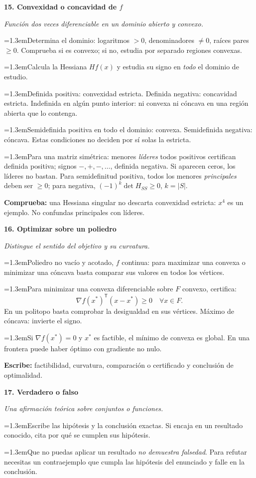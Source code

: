 \documentclass[a4paper,landscape]{article}
\newcommand{\T}{^{\mathsf T}}
\newcommand{\caso}[2]{\par\vspace{5pt}\colorbox{pale}{\parbox{\dimexpr\linewidth-2\fboxsep}{\bfseries\color{accent}#1}}\par\textit{#2}\par}
\newcommand{\paso}[2]{\par\hangindent=1.3em\hangafter=1\makebox[1.3em][l]{\textbf{\color{accent}#1}}#2}
\newcommand{\escribe}[1]{\par\textbf{Escribe:} #1}
\newcommand{\ojo}[1]{\par\textbf{Comprueba:} #1}
\newcommand{\columna}[1]{\begin{minipage}[t]{0.319\textwidth}\fontsize{9.2}{10.6}\selectfont\RaggedRight #1\end{minipage}}
\begin{document}
\columna{
\caso{15. Convexidad o concavidad de \(f\)}{Función dos veces diferenciable en un dominio abierto y convexo.}
\paso{1.}{Determina el dominio: logaritmos \(>0\), denominadores \(\ne0\), raíces pares \(\ge0\). Comprueba si es convexo; si no, estudia por separado regiones convexas.}
\paso{2.}{Calcula la Hessiana \(Hf(x)\) y estudia su signo en \emph{todo} el dominio de estudio.}
\paso{3.}{Definida positiva: convexidad estricta. Definida negativa: concavidad estricta. Indefinida en algún punto interior: ni convexa ni cóncava en una región abierta que lo contenga.}
\paso{4.}{Semidefinida positiva en todo el dominio: convexa. Semidefinida negativa: cóncava. Estas condiciones no deciden por sí solas la estricta.}
\paso{5.}{Para una matriz simétrica: menores \emph{líderes} todos positivos certifican definida positiva; signos \(-,+,-,\ldots\), definida negativa. Si aparecen ceros, los líderes no bastan. Para semidefinitud positiva, todos los menores \emph{principales} deben ser \(\ge0\); para negativa, \((-1)^k\det H_{SS}\ge0\), \(k=|S|\).}
\ojo{una Hessiana singular no descarta convexidad estricta: \(x^4\) es un ejemplo. No confundas principales con líderes.}

\caso{16. Optimizar sobre un poliedro}{Distingue el sentido del objetivo y su curvatura.}
\paso{1.}{Poliedro no vacío y acotado, \(f\) continua: para maximizar una convexa o minimizar una cóncava basta comparar sus valores en todos los vértices.}
\paso{2.}{Para minimizar una convexa diferenciable sobre \(F\) convexo, certifica:
\[\nabla f(x^*)\T(x-x^*)\ge0\quad\forall x\in F.\]
En un politopo basta comprobar la desigualdad en sus vértices. Máximo de cóncava: invierte el signo.}
\paso{3.}{Si \(\nabla f(x^*)=0\) y \(x^*\) es factible, el mínimo de convexa es global. En una frontera puede haber óptimo con gradiente no nulo.}
\escribe{factibilidad, curvatura, comparación o certificado y conclusión de optimalidad.}

\caso{17. Verdadero o falso}{Una afirmación teórica sobre conjuntos o funciones.}
\paso{1.}{Escribe las hipótesis y la conclusión exactas. Si encaja en un resultado conocido, cita por qué se cumplen sus hipótesis.}
\paso{2.}{Que no puedas aplicar un resultado \emph{no demuestra falsedad}. Para refutar necesitas un contraejemplo que cumpla las hipótesis del enunciado y falle en la conclusión.}
}
\end{document}
